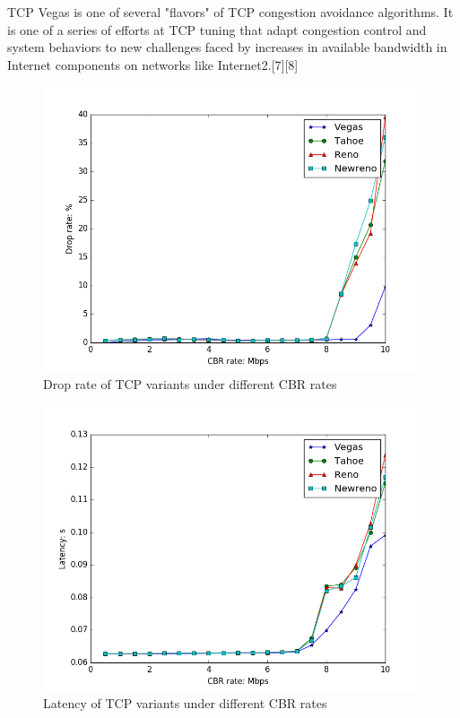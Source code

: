 \documentclass[10pt, conference]{IEEEtran/IEEEtran}
\begin{document}
TCP Vegas is one of several "flavors" of TCP congestion avoidance algorithms. It is one of a series of efforts at TCP tuning that adapt congestion control and system behaviors to new challenges faced by increases in available bandwidth in Internet components on networks like Internet2.[7][8]


\begin{figure}[htbp]
\begin{center}
\includegraphics[width=\linewidth]{../exp1/exp1_drop.png}
\caption{Drop rate of TCP variants under different CBR rates}
\label{exp1_drop}
\end{center}
\end{figure}

\begin{figure}[htbp]
\begin{center}
\includegraphics[width=\linewidth]{../exp1/exp1_lat.png}
\caption{Latency of TCP variants under different CBR rates}
\label{exp1_lat}
\end{center}
\end{figure}
\end{document}
